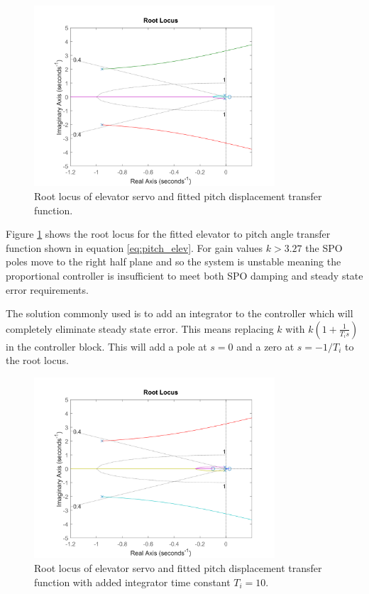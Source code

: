 \documentclass{article}
\begin{document}
\begin{figure}[H]
    \centering
    \includegraphics[width=0.8\textwidth]{figures/pitch_autopilot_locus_bad.png}
    \caption{Root locus of elevator servo and fitted pitch displacement transfer function.}
    \label{fig:fitted_pitchrate_rlocus}
\end{figure}

Figure \ref{fig:fitted_pitchrate_rlocus} shows the root locus for the fitted elevator to pitch angle transfer function shown in equation \ref{eq:pitch_elev}.
For gain values $k>3.27$ the SPO poles move to the right half plane and so the system is unstable meaning the proportional controller is insufficient to meet both SPO damping and steady state error requirements.

The solution commonly used is to add an integrator to the controller which will completely eliminate steady state error.
This means replacing $k$ with $k(1 + \frac{1}{T_i s})$ in the controller block.
This will add a pole at $s=0$ and a zero at $s=-1/T_i$ to the root locus.

\begin{figure}[H]
    \centering
    \includegraphics[width=0.8\textwidth]{figures/pitch_autopilot_locus_intbad.png}
    \caption{Root locus of elevator servo and fitted pitch displacement transfer function with added integrator time constant $T_i = 10$.}
    \label{fig:fitted_pitchrate_rlocus_int}
\end{figure}
\end{document}
